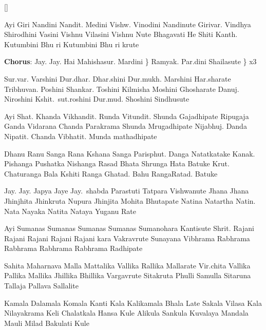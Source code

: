 []

    \beginverse{}
        Ayi Giri Nandini Nandit. Medini
        Vishw. Vinodini Nandinute
        Girivar. Vindhya Shirodhini Vasini
        Vishnu Vilasini Vishnu Nute
        Bhagavati He Shiti Kanth. Kutumbini
        Bhu ri Kutumbini Bhu ri krute
    \endverse{}

    \beginchorus{}
        {\bf Chorus}:
        Jay. Jay. Hai Mahishasur. Mardini \}
        Ramyak. Par.dini Shailasute \} x3
    \endchorus{}

    \beginverse{}
        Sur.var. Varshini Dur.dhar. Dhar.shini
        Dur.mukh. Marshini Har.sharate
        Tribhuvan. Poshini Shankar. Toshini
        Kilmisha Moshini Ghosharate
        Danuj. Niroshini Kshit.\ sut.roshini
        Dur.mud. Shoshini Sindhusute
    \endverse{}

    \beginverse{}
        Ayi Shat. Khanda Vikhandit. Runda
        Vitundit. Shunda Gajadhipate
        Ripugaja Ganda Vidarana Chanda
        Parakrama Shunda Mrugadhipate
        Nijabhuj. Danda Nipatit. Chanda
        Vibhatit. Munda mathadhipate
    \endverse{}

    \beginverse{}
        Dhanu Ranu Sanga Rana Kshana Sanga
        Parisphut. Danga Natatkatake
        Kanak. Pishanga Pushatka Nishanga
        Rasad Bhata Shrunga Hata Batuke
        Krut. Chaturanga Bala Kshiti Ranga
        Ghatad. Bahu RangaRatad. Batuke
    \endverse{}

    \beginverse{}
        Jay. Jay. Japya Jaye Jay.\ shabda
        Parastuti Tatpara Vishwanute
        Jhana Jhana Jhinjhita Jhinkruta Nupura
        Jhinjita Mohita Bhutapate
        Natina Natartha Natin. Nata Nayaka
        Natita Nataya Yuganu Rate
    \endverse{}

    \beginverse{}
        Ayi Sumanas Sumanas Sumanas
        Sumanas Sumanohara Kantisute
        Shrit. Rajani Rajani Rajani
        Rajani Rajani kara Vakravrute
        Sunayana Vibhrama Rabhrama Rabhrama
        Rabhrama Rabhrama Radhipate
    \endverse{}

    \beginverse{}
        Sahita Maharnava Malla Mattalika
        Vallika Rallika Mallarate
        Vir.chita Vallika Pallika Mallika
        Jhillika Bhillika Vargavrute
        Sitakruta Phulli Samulla Sitaruna
        Tallaja Pallava Sallalite
    \endverse{}

    \beginverse{}
        Kamala Dalamala Komala Kanti
        Kala Kalikamala Bhala Late
        Sakala Vilasa Kala Nilayakrama
        Keli Chalatkala Hansa Kule
        Alikula Sankula Kuvalaya Mandala
        Mauli Milad Bakulati Kule
    \endverse{}
\endsong{}

\newpage